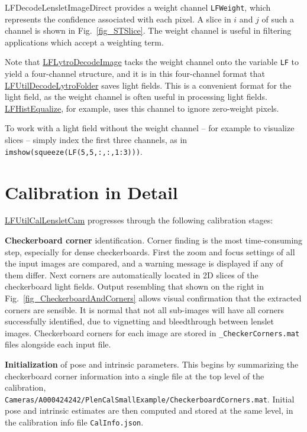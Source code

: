 \documentclass[onecolumn]{article}
\newcommand{\CiteFunc}[1]{\hyperlink{#1}{\small #1}}
\newcommand{\SupFunction}[1]{{\small #1}}
\newcommand{\SymbolText}[1]{\texttt{\small #1}}
\begin{document}
\SupFunction{LFDecodeLensletImageDirect} provides a weight channel \SymbolText{LFWeight}, which represents the confidence associated with each pixel. A slice in $i$ and $j$ of such a channel is shown in Fig.~\ref{fig_STSlice}. The weight channel is useful in filtering applications which accept a weighting term.

Note that \CiteFunc{LFLytroDecodeImage} tacks the weight channel onto the variable \SymbolText{LF} to yield a four-channel structure, and it is in this four-channel format that \CiteFunc{LFUtilDecodeLytroFolder} saves light fields. This is a convenient format for the light field, as the weight channel is often useful in processing light fields.  \CiteFunc{LFHistEqualize}, for example, uses this channel to ignore zero-weight pixels. 

To work with a light field without the weight channel -- for example to visualize slices -- simply index the first three channels, as in\\ \SymbolText{imshow(squeeze(LF(5,5,:,:,1:3)))}.

\section{Calibration in Detail}
\label{sect_Calibration}
\CiteFunc{LFUtilCalLensletCam} progresses through the following calibration stages:

\textbf{Checkerboard corner} identification.  Corner finding is the most time-consuming step, especially for dense checkerboards.  First the zoom and focus settings of all the input images are compared, and a warning message is displayed if any of them differ.  Next corners are automatically located in 2D slices of the checkerboard light fields.  Output resembling that shown on the right in Fig.~\ref{fig_CheckerboardAndCorners} allows visual confirmation that the extracted corners are sensible. It is normal that not all sub-images will have all corners successfully identified, due to vignetting and bleedthrough between lenslet images.  Checkerboard corners for each image are stored in \SymbolText{*\_CheckerCorners.mat} files alongside each input file.

\textbf{Initialization} of pose and intrinsic parameters. This begins by summarizing the checkerboard corner information into a single file at the top level of the calibration, \SymbolText{Cameras/A000424242/PlenCalSmallExample/CheckerboardCorners.mat}. Initial pose and intrinsic estimates are then computed and stored at the same level, in the calibration info file \SymbolText{CalInfo.json}.
\end{document}
